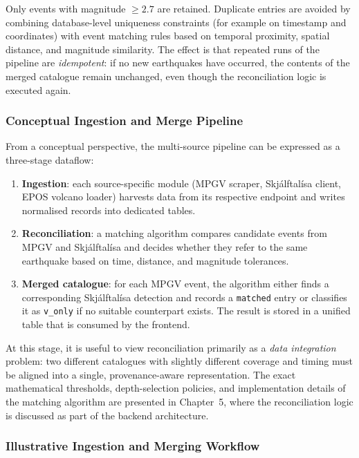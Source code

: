 \documentclass[12pt]{article}
\begin{document}
Only events with magnitude $\geq 2.7$ are retained. Duplicate entries are avoided by combining database-level uniqueness constraints (for example on timestamp and coordinates) with event matching rules based on temporal proximity, spatial distance, and magnitude similarity. The effect is that repeated runs of the pipeline are \emph{idempotent}: if no new earthquakes have occurred, the contents of the merged catalogue remain unchanged, even though the reconciliation logic is executed again.

\subsubsection*{Conceptual Ingestion and Merge Pipeline}

From a conceptual perspective, the multi-source pipeline can be expressed as a three-stage dataflow:

\begin{enumerate}
    \item \textbf{Ingestion}: each source-specific module (MPGV scraper, Skjálftalísa client, EPOS volcano loader) harvests data from its respective endpoint and writes normalised records into dedicated tables.
    \item \textbf{Reconciliation}: a matching algorithm compares candidate events from MPGV and Skjálftalísa and decides whether they refer to the same earthquake based on time, distance, and magnitude tolerances.
    \item \textbf{Merged catalogue}: for each MPGV event, the algorithm either finds a corresponding Skjálftalísa detection and records a \texttt{matched} entry or classifies it as \texttt{v\_only} if no suitable counterpart exists. The result is stored in a unified table that is consumed by the frontend.
\end{enumerate}

At this stage, it is useful to view reconciliation primarily as a \emph{data integration} problem: two different catalogues with slightly different coverage and timing must be aligned into a single, provenance-aware representation. The exact mathematical thresholds, depth-selection policies, and implementation details of the matching algorithm are presented in Chapter~5, where the reconciliation logic is discussed as part of the backend architecture.

\subsubsection*{Illustrative Ingestion and Merging Workflow}
\end{document}

